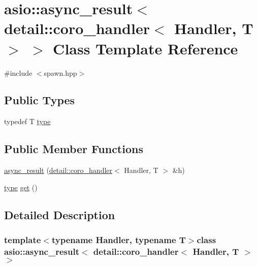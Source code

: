 \hypertarget{classasio_1_1async__result_3_01detail_1_1coro__handler_3_01_handler_00_01_t_01_4_01_4}{}\section{asio\+:\+:async\+\_\+result$<$ detail\+:\+:coro\+\_\+handler$<$ Handler, T $>$ $>$ Class Template Reference}
\label{classasio_1_1async__result_3_01detail_1_1coro__handler_3_01_handler_00_01_t_01_4_01_4}


{\ttfamily \#include $<$spawn.\+hpp$>$}

\subsection*{Public Types}
\begin{DoxyCompactItemize}
\item 
typedef T \hyperlink{classasio_1_1async__result_3_01detail_1_1coro__handler_3_01_handler_00_01_t_01_4_01_4_ae65f75e8d2f331be17e568287c883ad3}{type}
\end{DoxyCompactItemize}
\subsection*{Public Member Functions}
\begin{DoxyCompactItemize}
\item 
\hyperlink{classasio_1_1async__result_3_01detail_1_1coro__handler_3_01_handler_00_01_t_01_4_01_4_a560ae298ce87824774a42623e20a999e}{async\+\_\+result} (\hyperlink{classasio_1_1detail_1_1coro__handler}{detail\+::coro\+\_\+handler}$<$ Handler, T $>$ \&h)
\item 
\hyperlink{classasio_1_1async__result_3_01detail_1_1coro__handler_3_01_handler_00_01_t_01_4_01_4_ae65f75e8d2f331be17e568287c883ad3}{type} \hyperlink{classasio_1_1async__result_3_01detail_1_1coro__handler_3_01_handler_00_01_t_01_4_01_4_a3e746e4873af50c599a5ec4593ca5a1d}{get} ()
\end{DoxyCompactItemize}


\subsection{Detailed Description}
\subsubsection*{template$<$typename Handler, typename T$>$class asio\+::async\+\_\+result$<$ detail\+::coro\+\_\+handler$<$ Handler, T $>$ $>$}



